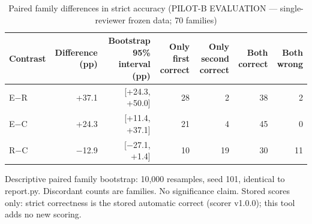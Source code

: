 \begin{table}[t]
\centering
\small
\caption{Paired family differences in strict accuracy (PILOT-B EVALUATION --- single-reviewer frozen data; 70 families)}
\label{tab:pilotb-Llama-3.2-3B-Instruct-paired}
\begin{tabular}{lrrrrrr}
\toprule
Contrast & Difference (pp) & Bootstrap 95\% interval (pp) & Only first correct & Only second correct & Both correct & Both wrong \\
\midrule
E$-$R & +37.1 & [+24.3, +50.0] & 28 & 2 & 38 & 2 \\
E$-$C & +24.3 & [+11.4, +37.1] & 21 & 4 & 45 & 0 \\
R$-$C & $-$12.9 & [$-$27.1, +1.4] & 10 & 19 & 30 & 11 \\
\bottomrule
\end{tabular}
\par\smallskip
\parbox{\linewidth}{\footnotesize Descriptive paired family bootstrap: 10,000 resamples, seed 101, identical to report.py. Discordant counts are families. No significance claim. Stored scores only: strict correctness is the stored automatic correct (scorer v1.0.0); this tool adds no new scoring.}
\end{table}
